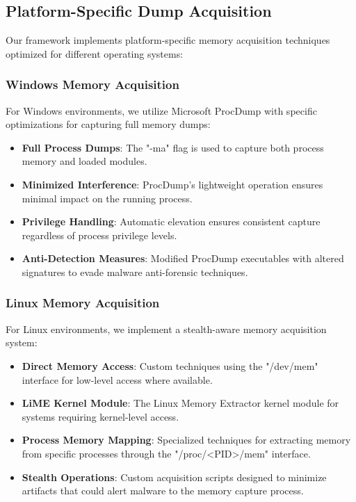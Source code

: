 \subsection{Platform-Specific Dump Acquisition}
\label{subsec:platform-specific}

Our framework implements platform-specific memory acquisition techniques optimized for different operating systems:

\subsubsection{Windows Memory Acquisition}

For Windows environments, we utilize Microsoft ProcDump with specific optimizations for capturing full memory dumps:

\begin{itemize}
    \item \textbf{Full Process Dumps}: The "-ma" flag is used to capture both process memory and loaded modules.
    \item \textbf{Minimized Interference}: ProcDump's lightweight operation ensures minimal impact on the running process.
    \item \textbf{Privilege Handling}: Automatic elevation ensures consistent capture regardless of process privilege levels.
    \item \textbf{Anti-Detection Measures}: Modified ProcDump executables with altered signatures to evade malware anti-forensic techniques.
\end{itemize}

\subsubsection{Linux Memory Acquisition}

For Linux environments, we implement a stealth-aware memory acquisition system:

\begin{itemize}
    \item \textbf{Direct Memory Access}: Custom techniques using the "/dev/mem" interface for low-level access where available.
    \item \textbf{LiME Kernel Module}: The Linux Memory Extractor kernel module for systems requiring kernel-level access.
    \item \textbf{Process Memory Mapping}: Specialized techniques for extracting memory from specific processes through the "/proc/<PID>/mem" interface.
    \item \textbf{Stealth Operations}: Custom acquisition scripts designed to minimize artifacts that could alert malware to the memory capture process.
\end{itemize}

